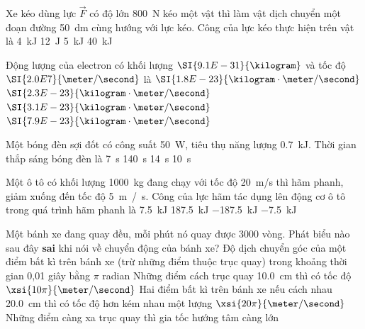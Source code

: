 \begin{ex}
	Xe kéo dùng lực $\vec{F}$ có độ lớn \SI{800}{{\newton}} kéo một vật thì làm vật dịch chuyển một đoạn đường \SI{50}{\deci\meter} cùng hướng với lực kéo. Công của lực kéo thực hiện trên vật là
	\choice
	{\True \SI{4}{\kilo\joule}}
	{\SI{12}{\joule}}
	{\SI{5}{\kilo\joule}}
	{\SI{40}{\kilo\joule}}
	\loigiai{}
\end{ex}
\begin{ex}
	Động lượng của electron có khối lượng $\SI{9.1E-31}{\kilogram}$ và tốc độ $\SI{2.0E7}{\meter/\second}$ là
	\choice
	{\True $\SI{1.8E-23}{\kilogram\cdot\meter/\second}$}
	{$\SI{2.3E-23}{\kilogram\cdot\meter/\second}$}
	{$\SI{3.1E-23}{\kilogram\cdot\meter/\second}$}
	{$\SI{7.9E-23}{\kilogram\cdot\meter/\second}$}
	\loigiai{}
\end{ex}
\begin{ex}
	Một bóng đèn sợi đốt có công suất \SI{50}{\watt}, tiêu thụ năng lượng \SI{0.7}{\kilo\joule}. Thời gian thắp sáng bóng đèn là
	\choice
	{\SI{7}{\second}}
	{\SI{140}{\second}}
	{\True \SI{14}{\second}}
	{\SI{10}{\second}}
	\loigiai{}
\end{ex}
\begin{ex}
	Một ô tô có khối lượng \SI{1000}{\kilogram} đang chạy với tốc độ \SI{20}{\meter/\second} thì hãm phanh, giảm xuống đến tốc độ \SI{5}{\meter
		/\second}. Công của lực hãm tác dụng lên động cơ ô tô  trong quá trình hãm phanh là
	\choice
	{\SI{7.5}{\kilo\joule}}
	{\SI{187.5}{\kilo\joule}}
	{\True \SI{-187.5}{\kilo\joule}}
	{\SI{-7.5}{\kilo\joule}}
	\loigiai{}
\end{ex}
\begin{ex}
	Một bánh xe đang quay đều, mỗi phút nó quay được 3000 vòng. Phát biểu nào sau đây \textbf{sai} khi nói về chuyển động của bánh xe?
	\choice
	{Độ dịch chuyển góc của một điểm bất kì trên bánh xe (trừ những điểm thuộc trục quay) trong khoảng thời gian 0,01 giây bằng $\pi$ radian}
	{Những điểm cách trục quay \SI{10.0}{\centi\meter} thì có tốc độ $\xsi{10\pi}{\meter/\second}$}
	{\True Hai điểm bất kì trên bánh xe nếu cách nhau \SI{20.0}{\centi\meter} thì có tốc độ hơn kém nhau một lượng $\xsi{20\pi}{\meter/\second}$}
	{Những điểm càng xa trục quay thì gia tốc hướng tâm càng lớn}
	\loigiai{}
\end{ex}
